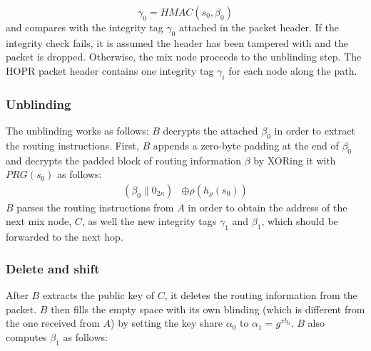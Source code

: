 $$\gamma_0=HMAC(s_0,\beta_0)$$
and compares with the integrity tag $\gamma_0$ attached in the packet header. If the integrity check fails, it is assumed the header has been tampered with and the packet is dropped. Otherwise, the mix node proceeds to the unblinding step. The HOPR packet header contains one integrity tag $\gamma_i$ for each node along the path.

\subsubsection{Unblinding}
The unblinding works as follows: $B$ decrypts the attached $\beta_0$ in order to extract the routing instructions. First, $B$ appends a zero-byte padding at the end of $\beta_0$ and decrypts the padded block of routing information $\beta$ by XORing it with $PRG(s_{0})$ as follows:
\begin{align}
    (\beta_0\|0_{2\kappa}) & \oplus \rho(h_{\rho}(s_{0}))
\end{align}
$B$ parses the routing instructions from $A$ in order to obtain the address of the next mix node, $C$, as well the new integrity tags $\gamma_1$ and $\beta_1$, which should be forwarded to the next hop.

\subsubsection{Delete and shift}
After $B$ extracts the public key of $C$, it deletes the routing information from the packet. $B$ then fills the empty space with its own blinding (which is different from the one received from $A$) by setting the key share $\alpha_0$ to $\alpha_1=g^{xb_0}$. $B$ also computes $\beta_1$ as follows:

